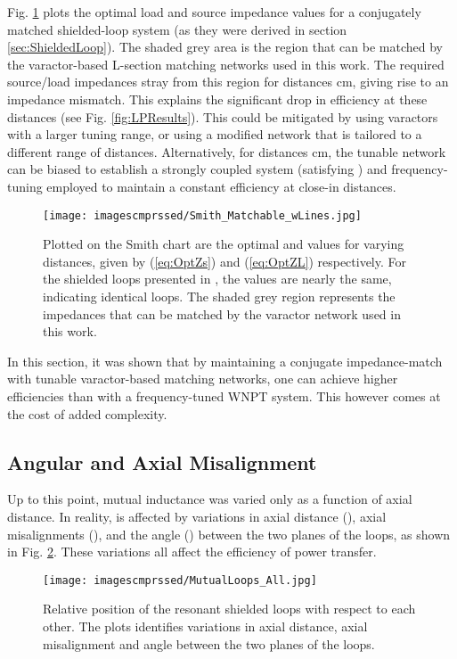 \documentclass[journal]{IEEEtran}
\begin{document}
Fig. \ref{fig:smith} plots the optimal load and source impedance values for a conjugately matched shielded-loop system (as they were derived in section \ref{sec:ShieldedLoop}). The shaded grey area is the region that can be matched by the varactor-based L-section matching networks used in this work. The required source/load impedances stray from this region for distances  cm, giving rise to an impedance mismatch. This explains the significant drop in efficiency at these distances (see Fig. \ref{fig:LPResults}). This could be mitigated by using varactors with a larger tuning range, or using a modified network that is tailored to a different range of distances. Alternatively, for distances  cm, the tunable network can be biased to establish a strongly coupled system (satisfying ) and frequency-tuning employed to maintain a constant efficiency at close-in distances.
\begin{figure}[htbp]
    \centering
    \texttt{[image: imagescmprssed/Smith\_Matchable\_wLines.jpg]}
    \caption{Plotted on the Smith chart are the optimal  and  values for varying distances, given by (\ref{eq:OptZs}) and (\ref{eq:OptZL}) respectively. For the shielded loops presented in \cite{Thomas}, the values are nearly the same, indicating identical loops. The shaded grey region represents the impedances that can be matched by the varactor network used in this work.}
    \label{fig:smith}
\end{figure}

In this section, it was shown that by maintaining a conjugate impedance-match with tunable varactor-based matching networks, one can achieve higher efficiencies than with a frequency-tuned WNPT system. This however comes at the cost of added complexity.

\subsection{Angular and Axial Misalignment}

Up to this point, mutual inductance  was varied only as a function of axial distance. In reality,  is affected by variations in axial distance (), axial misalignments (), and the angle () between the two planes of the loops, as shown in Fig. \ref{fig:MutualLoops_All}. These variations all affect the efficiency of power transfer.
\begin{figure}[htbp]
    \centering
    \texttt{[image: imagescmprssed/MutualLoops\_All.jpg]}
    \caption{Relative position of the resonant shielded loops with respect to each other. The plots identifies variations in axial distance, axial misalignment and angle between the two planes of the loops.}
    \label{fig:MutualLoops_All}
\end{figure}
\end{document}
